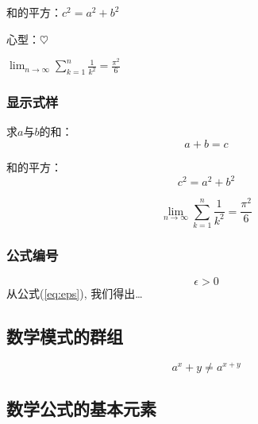 \documentclass[a4paper,12pt]{article}
\begin{document}
和的平方：$c^{2}=a^{2}+b^{2}$

心型：\begin{math}\heartsuit\end{math}

$\lim_{n \to \infty}\sum_{k=1}^n \frac{1}{k^2} = \frac{\pi^2}{6}$

\subsubsection{显示式样}

求$a$与$b$的和：
\begin{displaymath}a+b=c\end{displaymath}

和的平方：\[c^{2}=a^{2}+b^{2}\]

\begin{displaymath}
\lim_{n \to \infty}
\sum_{k=1}^n \frac{1}{k^2}
= \frac{\pi^2}{6}
\end{displaymath}

\subsubsection{公式编号}

\begin{equation} \label{eq:eps}
\epsilon > 0
\end{equation}
从公式(\ref{eq:eps}), 我们得出\ldots

\subsection{数学模式的群组}

\begin{equation}
a^x+y \neq a^{x+y}
\end{equation}

\subsection{数学公式的基本元素}
\end{document}

